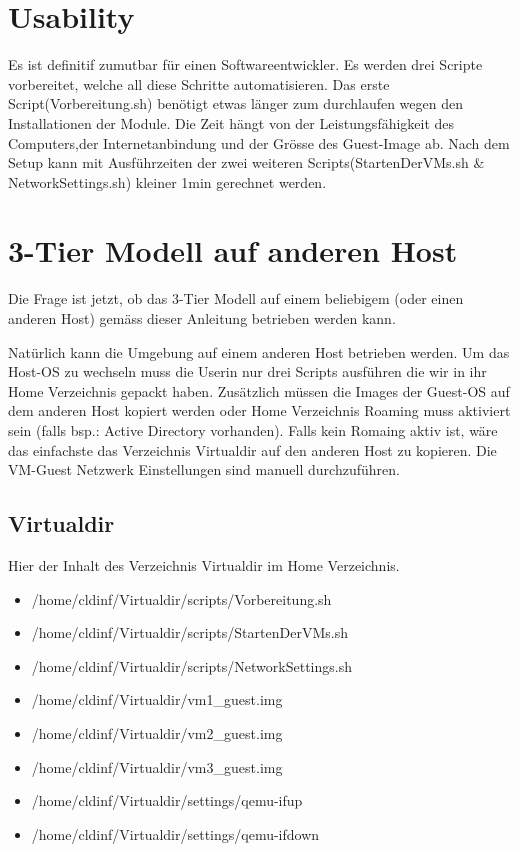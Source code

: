 \documentclass[a4,12pt]{scrartcl}
\begin{document}
\section{Usability}
Es ist definitif zumutbar für einen Softwareentwickler. Es werden drei Scripte vorbereitet, welche all diese Schritte automatisieren. Das erste Script(Vorbereitung.sh) benötigt etwas länger zum durchlaufen wegen den Installationen der Module. Die Zeit hängt von der Leistungsfähigkeit des Computers,der Internetanbindung und der Grösse des Guest-Image ab. Nach dem Setup kann mit Ausführzeiten der zwei weiteren Scripts(StartenDerVMs.sh \& NetworkSettings.sh) kleiner 1min gerechnet werden. 

\section{3-Tier Modell auf anderen Host}
Die Frage ist jetzt, ob das 3-Tier Modell auf einem beliebigem (oder einen anderen Host) gemäss dieser Anleitung betrieben werden kann. 

\noindent Natürlich kann die Umgebung auf einem anderen Host betrieben werden. Um das Host-OS zu wechseln muss die Userin nur drei Scripts ausführen die wir in ihr Home Verzeichnis gepackt haben. Zusätzlich müssen die Images der Guest-OS auf dem anderen Host kopiert werden oder Home Verzeichnis Roaming muss aktiviert sein (falls bsp.: Active Directory vorhanden). Falls kein Romaing aktiv ist, wäre das einfachste das Verzeichnis Virtualdir auf den anderen Host zu kopieren. Die VM-Guest Netzwerk Einstellungen sind manuell durchzuführen. 

\subsection{Virtualdir}
Hier der Inhalt des Verzeichnis Virtualdir im Home Verzeichnis. 
\begin{itemize}
\item /home/cldinf/Virtualdir/scripts/Vorbereitung.sh
\item /home/cldinf/Virtualdir/scripts/StartenDerVMs.sh 
\item /home/cldinf/Virtualdir/scripts/NetworkSettings.sh
\item /home/cldinf/Virtualdir/vm1\_guest.img
\item /home/cldinf/Virtualdir/vm2\_guest.img
\item /home/cldinf/Virtualdir/vm3\_guest.img 
\item /home/cldinf/Virtualdir/settings/qemu-ifup
\item /home/cldinf/Virtualdir/settings/qemu-ifdown
\end{itemize}
\end{document}
